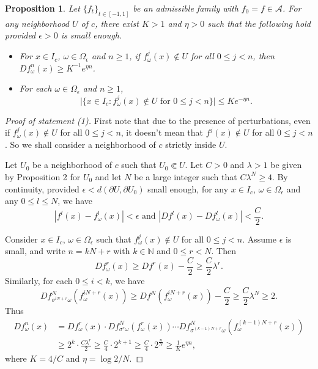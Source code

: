 \documentclass[11pt,oneside]{article}
\theoremstyle{plain}
\newtheorem{prop}{Proposition}
\numberwithin{equation}{section}
\numberwithin{figure}{section}
\numberwithin{table}{section}
\begin{document}
\begin{prop}
Let $\{f_t \}_{t \in [-1, 1]} $ be an admissible family with $f_0 =f \in \mathcal A$. For any neighborhood $U$ of $c$, there exist $K>1$ and $\eta >0$ such that the following hold provided $\epsilon >0$ is small enough.

\begin{itemize}
\item[(1)] For $x \in I_c$, $\omega \in \Omega_{\epsilon}$ and $n \geq 1$, if $f_{\omega}^j(x) \notin U$ for all $0 \leq j <n$, then $Df_{\omega}^n (x) \geq K^{-1} e^{\eta n}$.
\item[(2)] For each $\omega \in \Omega_{\epsilon}$ and $n \geq 1$,
\[
\big|\{x  \in I_c : f_{\omega}^j (x) \notin U \text{ for } 0 \leq j <n  \} \big| \leq K e^{- \eta n}.
\]
\end{itemize}
\end{prop}


\begin{proof}[Proof of statement (1)]

First note that due to the presence of perturbations, even if $f_{\omega}^j(x) \notin U$ for all $0 \leq j < n$, it doesn't mean that $f^j(x) \notin U$ for all $0 \leq j < n$. So we shall consider a neighborhood of $c$ strictly inside $U$.


Let $U_0$ be a neighborhood of $c$ such that $U_0 \Subset U$. Let $C>0$ and $\lambda>1$ be given by 
Proposition 2 for $U_0$ and let $N$ be a large integer such that $C \lambda^N \geq 4$. By continuity, provided $\epsilon < d(\partial U, \partial U_0)$ small enough, for any $x \in I_c$, $\omega \in \Omega_{\epsilon}$ and any $0 \leq l \leq N$, we have
\[
|f^l(x) - f_{\omega}^l(x)| < \epsilon \text{ and } |Df^l(x) - Df_{\omega}^l(x) | < \frac{C}{2}.
\]


Consider $x \in I_c$, $\omega \in \Omega_{\epsilon}$ such that $f_{\omega}^j (x) \notin U$ for all $0 \leq j < n$. Assume $\epsilon$ is small, and write $n = k N + r$ with $k \in \mathbb N$ and $0 \leq r < N$. Then
\[
D f_{\omega}^r (x) \geq Df^r (x) - \frac{C}{2} \geq \frac{C}{2} \lambda^r.
\]
Similarly, for each $0 \leq i <k$, we have
\[
D f_{\sigma^{iN +r}\omega}^N (f_{\omega}^{iN +r} (x) ) \geq D f^N (f_{\omega}^{iN +r} (x) ) - \frac{C}{2} \geq \frac{C}{2} \lambda^N \geq 2.
\]
Thus
\begin{align*}
Df_{\omega}^n (x) & = Df_{\omega}^r (x) \cdot Df_{\sigma^r\omega}^N (f_{\omega}^r (x)) \cdots D f_{\sigma^{(k-1)N +r}\omega}^N (f_{\omega}^{(k-1)N +r} (x) ) \\
& \geq 2^k \cdot \frac{C \lambda^r}{2} \geq \frac{C}{4} \cdot 2^{k+1} \geq \frac{C}{4} \cdot 2^{\frac{n}{N}} \geq \frac{1}{K} e^{\eta n},
\end{align*}
where $K = 4/C$ and $\eta = \log 2/N$.

\end{proof}
\end{document}
